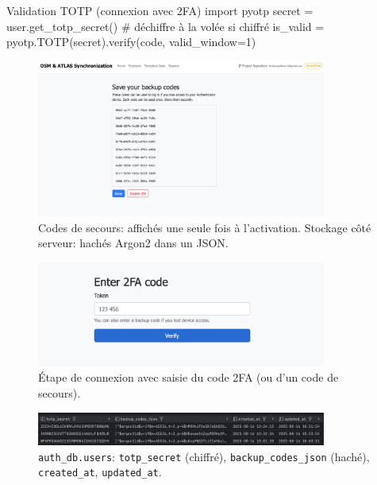 \begin{itemize}
\begin{codebox}[language=Python]{Validation TOTP (connexion avec 2FA)}
import pyotp
secret = user.get_totp_secret()  # déchiffre à la volée si chiffré
is_valid = pyotp.TOTP(secret).verify(code, valid_window=1)
\end{codebox}

\begin{figure}[H]
  \centering
  \includegraphics[width=0.85\textwidth]{../figures/chap10/backupcodes.png}
  \caption{Codes de secours: affichés une seule fois à l'activation. Stockage côté serveur: hachés Argon2 dans un JSON.}
\end{figure}

\begin{figure}[H]
  \centering
  \includegraphics[width=0.85\textwidth]{../figures/chap10/enter2FA.png}
  \caption{Étape de connexion avec saisie du code 2FA (ou d'un code de secours).}
\end{figure}

\begin{figure}[H]
  \centering
  \includegraphics[width=0.85\textwidth]{../figures/chap10/auth_db3.png}
  \caption{\texttt{auth\_db.users}: \texttt{totp\_secret} (chiffré), \texttt{backup\_codes\_json} (haché), \texttt{created\_at}, \texttt{updated\_at}.}
\end{figure}


\end{itemize}
